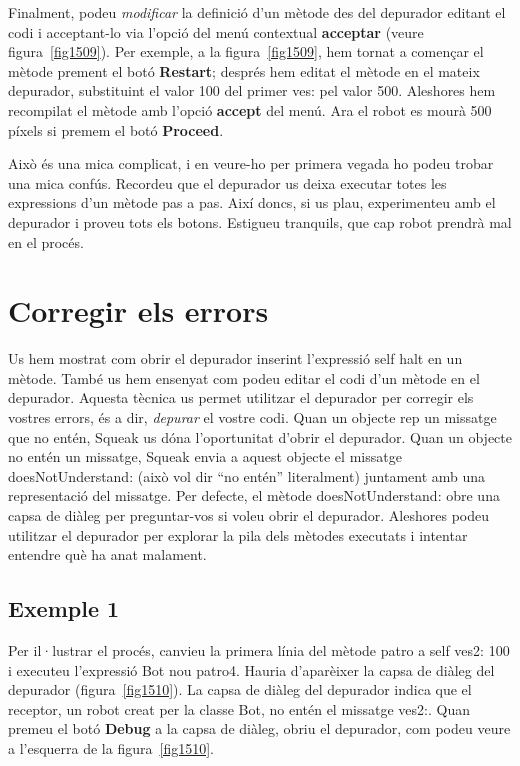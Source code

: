 \newpage

Finalment, podeu \emph{modificar} la definició d'un mètode des del depurador editant el codi i acceptant-lo via l'opció del menú contextual
\textbf{acceptar} (veure figura~\ref{fig1509}). Per exemple, a la figura~\ref{fig1509}, hem tornat a començar el mètode prement el botó \textbf{Restart}; després hem editat el mètode en el mateix depurador, substituint el valor 100 del primer \textsf{ves:} pel valor 500. Aleshores hem recompilat el mètode amb l'opció \textbf{accept} del menú. Ara el robot es mourà 500 píxels si premem el botó \textbf{Proceed}.

Això és una mica complicat, i en veure-ho per primera vegada ho podeu trobar una mica confús. Recordeu que el depurador us deixa executar totes les expressions d'un mètode pas a pas. Així doncs, si us plau, experimenteu amb el depurador i proveu tots els botons.
Estigueu tranquils, que cap robot prendrà mal en el procés.

\section{Corregir els errors}
Us hem mostrat com obrir el depurador inserint l'expressió \textsf{self halt} en un mètode. També us hem ensenyat com podeu editar el codi d'un mètode en el depurador. Aquesta tècnica us permet utilitzar el depurador per corregir els vostres errors, és a dir, \emph{depurar} el vostre codi. Quan un objecte rep un missatge que no entén, Squeak us dóna l'oportunitat d'obrir el depurador. Quan un objecte no entén un missatge, Squeak envia a aquest objecte el missatge \textsf{doesNotUnderstand:} (això vol dir ``no entén'' literalment) juntament amb una representació del missatge. Per defecte, el mètode \textsf{doesNotUnderstand:} obre una capsa de diàleg per preguntar-vos si voleu obrir el depurador. Aleshores podeu utilitzar el depurador per explorar la pila dels mètodes executats i intentar entendre què ha anat malament.

\subsection{Exemple 1}

Per il·lustrar el procés, canvieu la primera línia del mètode \textsf{patro} a \textsf{self ves2: 100} i executeu l'expressió \textsf{Bot nou patro4}. Hauria d'aparèixer la capsa de diàleg del depurador (figura~\ref{fig1510}). La capsa de diàleg del depurador indica que el receptor, un robot creat per la classe \textsf{Bot}, no entén el missatge \textsf{ves2:}. Quan premeu el botó \textbf{Debug} a la capsa de diàleg, obriu el depurador, com podeu veure a l'esquerra de la figura~\ref{fig1510}. 

